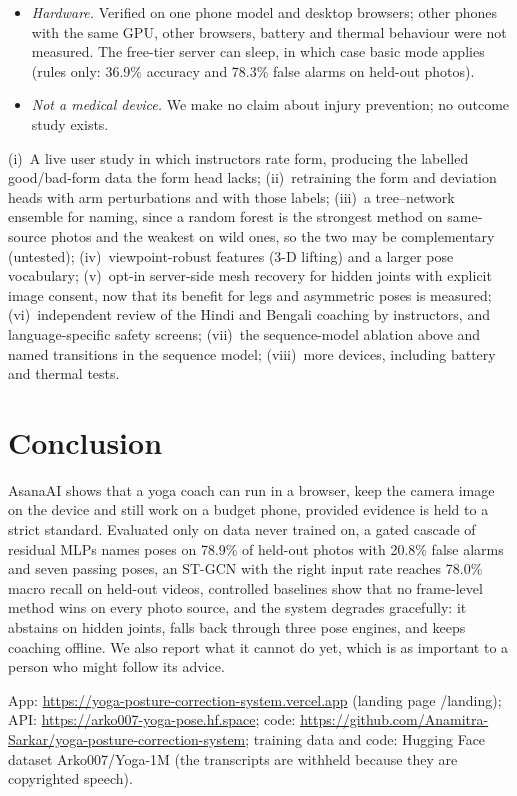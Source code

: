 \begin{itemize}
\item \emph{Hardware.} Verified on one phone model and desktop browsers; other phones with the same GPU, other browsers, battery and thermal behaviour were not measured. The free-tier server can sleep, in which case basic mode applies (rules only: 36.9\% accuracy and 78.3\% false alarms on held-out photos).
\item \emph{Not a medical device.} We make no claim about injury prevention; no outcome study exists.
\end{itemize}

 (i)~A live user study in which instructors rate form, producing the labelled good/bad-form data the form head lacks; (ii)~retraining the form and deviation heads with arm perturbations and with those labels; (iii)~a tree--network ensemble for naming, since a random forest is the strongest method on same-source photos and the weakest on wild ones, so the two may be complementary (untested); (iv)~viewpoint-robust features (3-D lifting) and a larger pose vocabulary; (v)~opt-in server-side mesh recovery for hidden joints with explicit image consent, now that its benefit for legs and asymmetric poses is measured; (vi)~independent review of the Hindi and Bengali coaching by instructors, and language-specific safety screens; (vii)~the sequence-model ablation above and named transitions in the sequence model; (viii)~more devices, including battery and thermal tests.

\section{Conclusion}
AsanaAI shows that a yoga coach can run in a browser, keep the camera image on the device and still work on a budget phone, provided evidence is held to a strict standard. Evaluated only on data never trained on, a gated cascade of residual MLPs names poses on 78.9\% of held-out photos with 20.8\% false alarms and seven passing poses, an ST-GCN with the right input rate reaches 78.0\% macro recall on held-out videos, controlled baselines show that no frame-level method wins on every photo source, and the system degrades gracefully: it abstains on hidden joints, falls back through three pose engines, and keeps coaching offline. We also report what it cannot do yet, which is as important to a person who might follow its advice.

 App: \url{https://yoga-posture-correction-system.vercel.app} (landing page /landing); API: \url{https://arko007-yoga-pose.hf.space}; code: \url{https://github.com/Anamitra-Sarkar/yoga-posture-correction-system}; training data and code: Hugging Face dataset Arko007/Yoga-1M (the transcripts are withheld because they are copyrighted speech).
